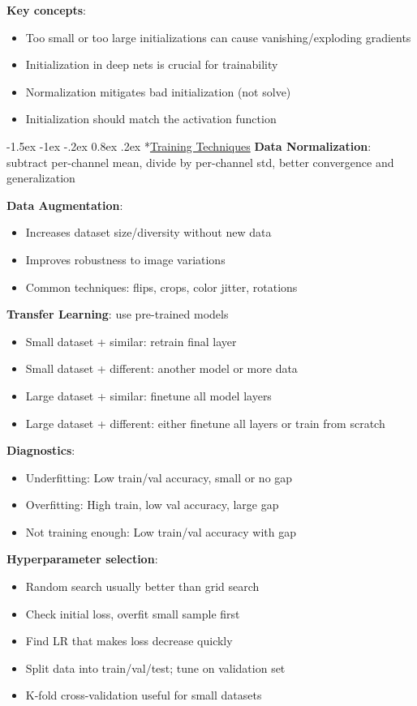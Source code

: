 \documentclass{article}
\makeatletter
\renewcommand\section{\@startsection{section}{1}{\z@}%
                                  {-1.5ex \@plus -1ex \@minus -.2ex}%
                                  {0.8ex \@plus.2ex}%
                                  {\normalfont\small\bfseries}}
\makeatother
\begin{document}
\begin{multicols}{3}
\textbf{Key concepts}:
\begin{itemize}
\item Too small or too large initializations can cause vanishing/exploding gradients
\item Initialization in deep nets is crucial for trainability
\item Normalization mitigates bad initialization (not solve)
\item Initialization should match the activation function
\end{itemize}

\section*{\underline{Training Techniques}}
\textbf{Data Normalization}: subtract per-channel mean, divide by per-channel std, better convergence and generalization

\textbf{Data Augmentation}:
\begin{itemize}
\item Increases dataset size/diversity without new data
\item Improves robustness to image variations
\item Common techniques: flips, crops, color jitter, rotations
\end{itemize}

\textbf{Transfer Learning}: use pre-trained models
\begin{itemize}
\item Small dataset + similar: retrain final layer
\item Small dataset + different: another model or more data
\item Large dataset + similar: finetune all model layers
\item Large dataset + different: either finetune all layers or train from scratch
\end{itemize}

\textbf{Diagnostics}:
\begin{itemize}
\item Underfitting: Low train/val accuracy, small or no gap
\item Overfitting: High train, low val accuracy, large gap
\item Not training enough: Low train/val accuracy with gap
\end{itemize}

\textbf{Hyperparameter selection}:
\begin{itemize}
\item Random search usually better than grid search
\item Check initial loss, overfit small sample first
\item Find LR that makes loss decrease quickly
\item Split data into train/val/test; tune on validation set
\item K-fold cross-validation useful for small datasets
\end{itemize}


\end{multicols}
\end{document}
